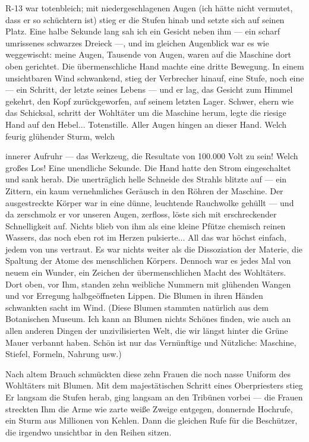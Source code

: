 R-13 war totenbleich; mit niedergeschlagenen Augen (ich hätte nicht
vermutet, dass er so schüchtern ist) stieg er die Stufen hinab und
setzte sich auf seinen Platz. Eine halbe Sekunde lang sah ich ein
Gesicht neben ihm — ein scharf umrissenes schwarzes Dreieck —, und
im gleichen Augenblick war es wie weggewischt: meine Augen,
Tausende von Augen, waren auf die Maschine dort oben gerichtet. Die
übermenschliche Hand machte eine dritte Bewegung. In einem
unsichtbaren Wind schwankend, stieg der Verbrecher hinauf, eine
Stufe, noch eine — ein Schritt, der letzte seines Lebens — und er
lag, das Gesicht zum Himmel gekehrt, den Kopf zurückgeworfen, auf
seinem letzten Lager. Schwer, ehern wie das Schicksal, schritt der
Wohltäter um die Maschine herum, legte die riesige Hand auf den
Hebel... Totenstille. Aller Augen hingen an dieser Hand. Welch
feurig glühender Sturm, welch

innerer Aufruhr — das Werkzeug, die Resultate von 100.000 Volt zu
sein! Welch großes Los! Eine unendliche Sekunde. Die Hand hatte den
Strom eingeschaltet und sank herab. Die unerträglich helle Schneide
des Strahls blitzte auf — ein Zittern, ein kaum vernehmliches
Geräusch in den Röhren der Maschine. Der ausgestreckte Körper war
in eine dünne, leuchtende Rauchwolke gehüllt — und da zerschmolz er
vor unseren Augen, zerfloss, löste sich mit erschreckender
Schnelligkeit auf. Nichts blieb von ihm als eine kleine Pfütze
chemisch reinen Wassers, das noch eben rot im Herzen pulsierte...
All das war höchst einfach, jedem von uns vertraut. Es war nichts
weiter als die Dissoziation der Materie, die Spaltung der Atome des
menschlichen Körpers. Dennoch war es jedes Mal von neuem ein
Wunder, ein Zeichen der übermenschlichen Macht des Wohltäters. Dort
oben, vor Ihm, standen zehn weibliche Nummern mit glühenden Wangen
und vor Erregung halbgeöffneten Lippen. Die Blumen in ihren Händen
schwankten sacht im Wind. (Diese Blumen stammten natürlich aus dem
Botanischen Museum. Ich kann an Blumen nichts Schönes finden, wie
auch an allen anderen Dingen der unzivilisierten Welt, die wir
längst hinter die Grüne Mauer verbannt haben. Schön ist nur das
Vernünftige und Nützliche: Maschine, Stiefel, Formeln, Nahrung
usw.)

Nach altem Brauch schmückten diese zehn Frauen die noch nasse
Uniform des Wohltäters mit Blumen. Mit dem majestätischen Schritt
eines Oberpriesters stieg Er langsam die Stufen herab, ging langsam
an den Tribünen vorbei — die Frauen streckten Ihm die Arme wie
zarte weiße Zweige entgegen, donnernde Hochrufe, ein Sturm aus
Millionen von Kehlen. Dann die gleichen Rufe für die Beschützer,
die irgendwo unsichtbar in den Reihen sitzen.

